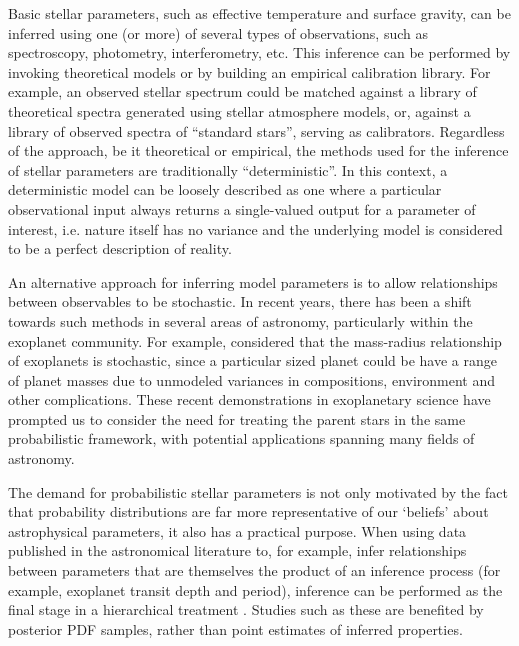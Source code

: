 Basic stellar parameters, such as effective temperature and surface gravity,
can be inferred using one (or more) of several types of observations, such as
spectroscopy, photometry, interferometry, etc. This inference can be performed
by invoking theoretical models or by building an empirical calibration
library.
For example, an observed stellar spectrum could be matched against a library of
theoretical spectra generated using stellar atmosphere models, or, against a
library of observed spectra of ``standard stars'', serving as calibrators.
Regardless of the approach, be it theoretical or empirical, the methods used
for the inference of stellar parameters are traditionally ``deterministic''.
In this context, a deterministic model can be loosely described as one where
a particular observational input always returns a single-valued output for a
parameter of interest, i.e. nature itself has no variance and the underlying
model is considered to be a perfect description of reality.

An alternative approach for inferring model parameters is to allow
relationships between observables to be stochastic.
In recent years, there has been a shift towards such methods in several areas
of astronomy, particularly within the exoplanet community.
For example, \citet{wolfgang:2015} considered that the mass-radius
relationship of exoplanets is stochastic, since a particular sized planet
could be have a range of planet masses due to unmodeled variances in
compositions, environment and other complications.
These recent demonstrations in exoplanetary science have prompted us to
consider the need for treating the parent stars in the same probabilistic
framework, with potential applications spanning many fields of astronomy.

The demand for probabilistic stellar parameters is not only motivated by the
fact that probability distributions are far more representative of our
`beliefs' about astrophysical parameters, it also has a practical purpose.
When using data published in the astronomical literature to, for example,
infer relationships between parameters that are themselves the product of an
inference process (for example, exoplanet transit depth and period), inference
can be performed as the final stage in a hierarchical treatment \citep[see,
e.g.][]{foreman-mackey:2014}.
Studies such as these are benefited by posterior PDF samples, rather than
point estimates of inferred properties.

